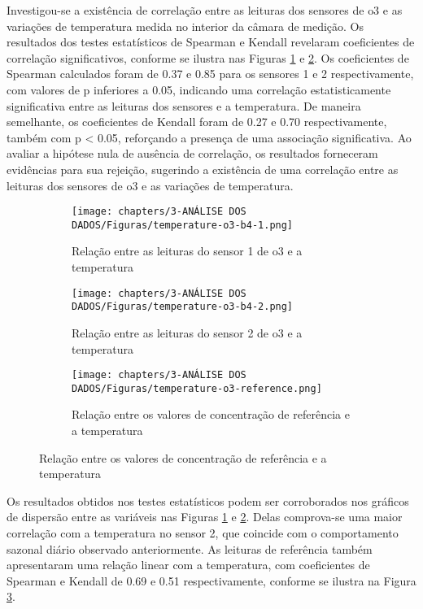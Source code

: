 Investigou-se a existência de correlação entre as leituras dos sensores de \acrshort{o3} e as variações de temperatura medida no interior da câmara de medição. Os resultados dos testes estatísticos de Spearman e Kendall revelaram coeficientes de correlação significativos, conforme se ilustra nas Figuras \ref{fig:data-temp-o3-1-corr} e \ref{fig:data-temp-o3-2-corr}. Os coeficientes de Spearman calculados foram de 0.37 e 0.85 para os sensores 1 e 2 respectivamente, com valores de p inferiores a 0.05, indicando uma correlação estatisticamente significativa entre as leituras dos sensores e a temperatura. De maneira semelhante, os coeficientes de Kendall foram de 0.27 e 0.70 respectivamente, também com p < 0.05, reforçando a presença de uma associação significativa. Ao avaliar a hipótese nula de ausência de correlação, os resultados forneceram evidências para sua rejeição, sugerindo a existência de uma correlação entre as leituras dos sensores de \acrshort{o3} e as variações de temperatura.

\begin{figure}[h]
    \centering
    \caption{Relação entre as leituras dos sensores de \acrshort{o3} e a temperatura}
    \begin{subfigure}{0.495\textwidth}
        \texttt{[image: chapters/3-ANÁLISE DOS DADOS/Figuras/temperature-o3-b4-1.png]}
        \caption{Relação entre as leituras do sensor 1 de \acrshort{o3} e a temperatura}
        \label{fig:data-temp-o3-1-corr}    
    \end{subfigure}
    \hfill
    \begin{subfigure}{0.495\textwidth}
        \texttt{[image: chapters/3-ANÁLISE DOS DADOS/Figuras/temperature-o3-b4-2.png]}
        \caption{Relação entre as leituras do sensor 2 de \acrshort{o3} e a temperatura}
        \label{fig:data-temp-o3-2-corr}    
    \end{subfigure}
    \hfill
    \begin{subfigure}{0.495\textwidth}
        \texttt{[image: chapters/3-ANÁLISE DOS DADOS/Figuras/temperature-o3-reference.png]}
        \caption{Relação entre os valores de concentração de referência e a temperatura}
        \label{fig:data-temp-o3-ref-corr}    
    \end{subfigure}
    \label{fig:data-temp-o3-corr}
\end{figure}

Os resultados obtidos nos testes estatísticos podem ser corroborados nos gráficos de dispersão entre as variáveis nas Figuras \ref{fig:data-temp-o3-1-corr} e \ref{fig:data-temp-o3-2-corr}. Delas comprova-se uma maior correlação com a temperatura no sensor 2, que coincide com o comportamento sazonal diário observado anteriormente. As leituras de referência também apresentaram uma relação linear com a temperatura, com coeficientes de Spearman e Kendall de 0.69 e 0.51 respectivamente, conforme se ilustra na Figura \ref{fig:data-temp-o3-ref-corr}.

